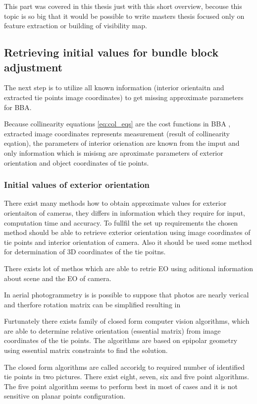 \documentclass[a4paper,12pt]{report}
\begin{document}
This part was covered in this thesis just with this short overview, becouse this topic is so big 
that it would be possible to write masters thesis focused only on feature extraction or building 
of visibility map.


\subsection{Retrieving initial values for bundle block adjustment}


The next step is to utilize all known information (interior orientaitn and extracted 
tie points image coordinates)  to get missing approximate parameters for BBA. 

Because collinearity equations \ref{eq:col_eqs} are the cost functions in BBA ,
extracted image coordinates represents measurement (result of collinearity eqation),
the parameters of interior orienation are known from the imput and only information 
which is misisng are aproximate parameters of exterior orientation and object coordinates of 
tie points. 

\subsubsection{Initial values of exterior orientation}

There exist many methods how to obtain approximate values for exterior orientaiton of cameras, they 
differs in information which they require for input, computation time and accuracy. 
To fullfil the set up requirements the chosen method should be able to retrieve exterior orientation 
using image coordinates of tie points and interior orientation of camera.
Also it should be used some method for determination of 3D coordinates of the tie poitns.

There exists lot of methos which are able to retrie EO using aditional 
information about scene and the EO of camera.

In aerial photogrammetry is is possible to suppose that photos are nearly verical and therfore 
rotation matrix can be simplified resulting in 

Furtunately there exists family of closed form computer vision algorithms,
which are able to determine relative orientation (essential matrix) from image coordinates 
of the tie points. The algorithms are based on epipolar geometry using essential matrix 
constraints to find the solution. 

The closed form algorithms are called accoridg to required number of identified tie points in two pictures.
There exist eight, seven, six and five point algorithms. The five point algorithm seems to perform best in most
of cases \cite{stewenius2006recent} and it is not sensitive on planar points configuration.
\end{document}
